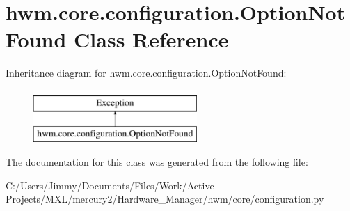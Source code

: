 \hypertarget{classhwm_1_1core_1_1configuration_1_1_option_not_found}{\section{hwm.\-core.\-configuration.\-Option\-Not\-Found Class Reference}
\label{classhwm_1_1core_1_1configuration_1_1_option_not_found}
}
Inheritance diagram for hwm.\-core.\-configuration.\-Option\-Not\-Found\-:\begin{figure}[H]
\begin{center}
\leavevmode
\includegraphics[height=2.000000cm]{classhwm_1_1core_1_1configuration_1_1_option_not_found}
\end{center}
\end{figure}


The documentation for this class was generated from the following file\-:\begin{DoxyCompactItemize}
\item 
C\-:/\-Users/\-Jimmy/\-Documents/\-Files/\-Work/\-Active Projects/\-M\-X\-L/mercury2/\-Hardware\-\_\-\-Manager/hwm/core/configuration.\-py\end{DoxyCompactItemize}
